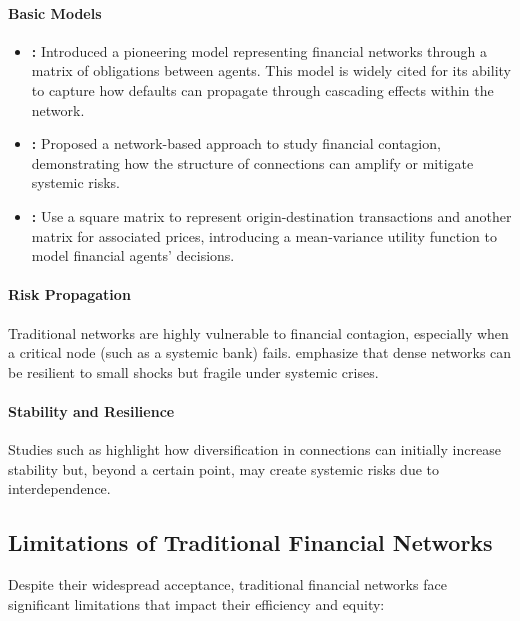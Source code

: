 \paragraph{Basic Models}
\begin{itemize}
    \item \textbf{:} Introduced a pioneering model representing financial networks through a matrix of obligations between agents. This model is widely cited for its ability to capture how defaults can propagate through cascading effects within the network.
    \item \textbf{:} Proposed a network-based approach to study financial contagion, demonstrating how the structure of connections can amplify or mitigate systemic risks.
    \item \textbf{:} Use a square matrix to represent origin-destination transactions and another matrix for associated prices, introducing a mean-variance utility function to model financial agents' decisions.
\end{itemize}



\paragraph{Risk Propagation}
Traditional networks are highly vulnerable to financial contagion, especially when a critical node (such as a systemic bank) fails.  emphasize that dense networks can be resilient to small shocks but fragile under systemic crises.

\paragraph{Stability and Resilience}
Studies such as  highlight how diversification in connections can initially increase stability but, beyond a certain point, may create systemic risks due to interdependence.

\subsection{Limitations of Traditional Financial Networks}

Despite their widespread acceptance, traditional financial networks face significant limitations that impact their efficiency and equity:

